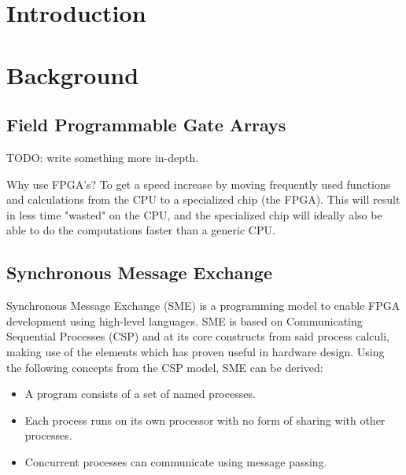 \documentclass[a4paper]{article}
\date{}
\title{}
\begin{document}
\maketitle
\tableofcontents
\newpage
\section{Introduction}
\label{sec:orgbc7af5f}

\section{Background}
\label{sec:org93938af}

\subsection{Field Programmable Gate Arrays}
\label{sec:orgce26244}
TODO: write something more in-depth.

Why use FPGA's? To get a speed increase by moving frequently used functions and calculations from the CPU to a specialized chip (the FPGA).
This will result in less time "wasted" on the CPU, and the specialized chip will ideally also be able to do the computations faster than a generic CPU.

\subsection{Synchronous Message Exchange}
\label{sec:orgc915c9a}
Synchronous Message Exchange (SME) is a programming model to enable FPGA development using high-level languages. SME is based on Communicating Sequential Processes (CSP) and at its core constructs from said process calculi, making use of the elements which has proven useful in hardware design\cite{sme}. Using the following concepts from the CSP model\cite{CSP}, SME can be derived:

\begin{itemize}
\item A program consists of a set of named processes.
\item Each process runs on its own processor with no form of sharing with other processes.
\item Concurrent processes can communicate using message passing.
\end{itemize}
\end{document}
